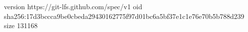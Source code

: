 version https://git-lfs.github.com/spec/v1
oid sha256:17d3bccca9be0cbeda29430162775f97d01bc6a5bf37e1c1e76e70b5b788d239
size 131168
